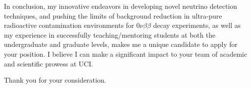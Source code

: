 \documentclass[10pt,a4paper,sans]{moderncv}        %
\begin{document}

In conclusion, my innovative endeavors in developing novel neutrino detection
techniques, and pushing the limits of background reduction in ultra-pure
radioactive contamination environments for $0\nu\beta\beta$ decay experiments,
as well as my experience in successfully teaching/mentoring students at both
the undergraduate and graduate levels, makes me a unique candidate to apply for
your position. I believe I can make a significant impact to your team of
academic and scientific prowess at UCI.

Thank you for your consideration.

\makeletterclosing
\end{document}

